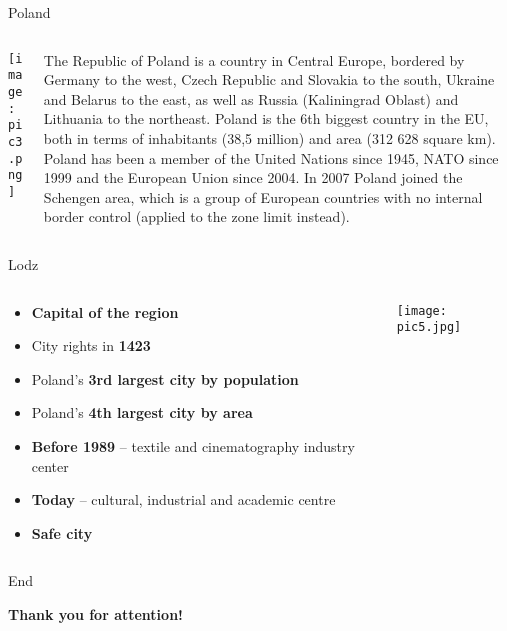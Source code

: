 \documentclass[hyperref={pdfpagemode=FullScreen}]{beamer}
\begin{document}
\begin{frame}{Poland}
\begin{columns}
\begin{column}{.5\textwidth}
\texttt{[image: pic3.png]}
\end{column}
\begin{column}{.5\textwidth}

\footnotesize{The Republic of Poland is a country in Central Europe, bordered by Germany to the west, Czech Republic and Slovakia to the south, Ukraine and Belarus to the east, as well as Russia (Kaliningrad Oblast) and Lithuania to the northeast. Poland is the 6th biggest country in the EU, both in terms of inhabitants (38,5 million) and area (312 628 square km). Poland has been a member of the United Nations since 1945, NATO since 1999 and the European Union since 2004. In 2007 Poland joined the Schengen area, which is a group of European countries with no internal border control (applied to the zone limit instead).}
\end{column}
\end{columns}
\end{frame}


\begin{frame}{Lodz}
\begin{columns}

\begin{column}{.5\textwidth}
\begin{itemize}
    \item\footnotesize\textbf{Capital of the region}
    \item\footnotesize{City rights in \textbf{1423}}
    \item\footnotesize{Poland’s \textbf{3rd largest city by population}}
    \item\footnotesize{Poland’s \textbf{4th largest city by area}}
    \item\footnotesize{\textbf{Before 1989} – textile and cinematography industry center}
    \item\footnotesize{\textbf{Today} – cultural, industrial and academic centre}
    \item\footnotesize\textbf{Safe city}
\end{itemize}
\end{column}

\begin{column}{.5\textwidth}
\texttt{[image: pic5.jpg]}
\end{column}
\end{columns}
\end{frame}


\begin{frame}{End}
\begin{center}
\Huge\textbf{Thank you for attention!}
\end{center}
\end{frame}
\end{document}
